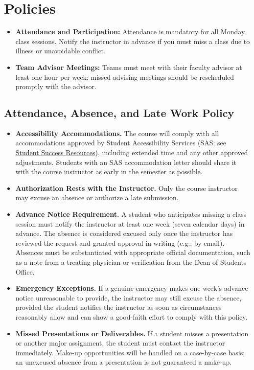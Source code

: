 \documentclass[11pt, letterpaper]{article}
\begin{document}
\section{Policies}
\begin{itemize}
    \item \textbf{Attendance and Participation:} Attendance is mandatory for all Monday class sessions. Notify the instructor in advance if you must miss a class due to illness or unavoidable conflict.
    \item \textbf{Team Advisor Meetings:} Teams must meet with their faculty advisor at least one hour per week; missed advising meetings should be rescheduled promptly with the advisor.
\end{itemize}

\subsection{Attendance, Absence, and Late Work Policy}
\label{sec:attendance}
\begin{itemize}
    \item \textbf{Accessibility Accommodations.} The course will comply with all accommodations approved by Student Accessibility Services (SAS; see \hyperref[sec:ssr]{Student Success Resources}), including extended time and any other approved adjustments. Students with an SAS accommodation letter should share it with the course instructor as early in the semester as possible.
    \item \textbf{Authorization Rests with the Instructor.} Only the course instructor may excuse an absence or authorize a late submission.
    \item \textbf{Advance Notice Requirement.} A student who anticipates missing a class session must notify the instructor at least one week (seven calendar days) in advance. The absence is considered excused only once the instructor has reviewed the request and granted approval in writing (e.g., by email). Absences must be substantiated with appropriate official documentation, such as a note from a treating physician or verification from the Dean of Students Office.
    \item \textbf{Emergency Exceptions.} If a genuine emergency makes one week's advance notice unreasonable to provide, the instructor may still excuse the absence, provided the student notifies the instructor as soon as circumstances reasonably allow and can show a good-faith effort to comply with this policy.
    \item \textbf{Missed Presentations or Deliverables.} If a student misses a presentation or another major assignment, the student must contact the instructor immediately. Make-up opportunities will be handled on a case-by-case basis; an unexcused absence from a presentation is not guaranteed a make-up.
\end{itemize}
\end{document}
